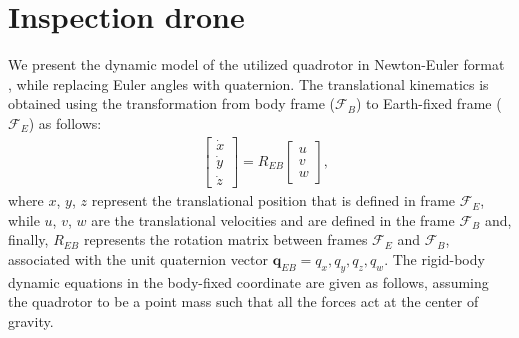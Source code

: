 \section{Inspection drone}\label{sec:robot}
We present the dynamic model of the utilized quadrotor in Newton-Euler format \cite{deepmodel_mohit}, while replacing Euler angles with quaternion. The translational kinematics is obtained using the transformation from body frame ($\mathcal{F}_B$) to Earth-fixed frame ($\mathcal{F}_E$) as follows:
%
\begin{align} \label{eq:kin_tilt}
	& \left[ \begin{array}{c} \dot{x} \\ \dot{y} \\ \dot{z} \end{array} \right] = R_{EB} \left[ \begin{array}{c} u \\ v \\ w \end{array} \right],
\end{align}
%
where $x$, $y$, $z$ represent the translational position that is defined in frame $\mathcal{F}_E$, while $u$, $v$, $w$ are the translational velocities and are defined in the frame $\mathcal{F}_B$ and, finally, $R_{EB}$ represents the rotation matrix between frames $\mathcal{F}_E$ and $\mathcal{F}_B$, %
%
%
associated with the unit quaternion vector $\mathbf{q}_{EB}=q_x, q_y, q_z, q_w$. The rigid-body dynamic equations in the body-fixed coordinate are given as follows, assuming the quadrotor to be a point mass such that all the forces act at the center of gravity.
